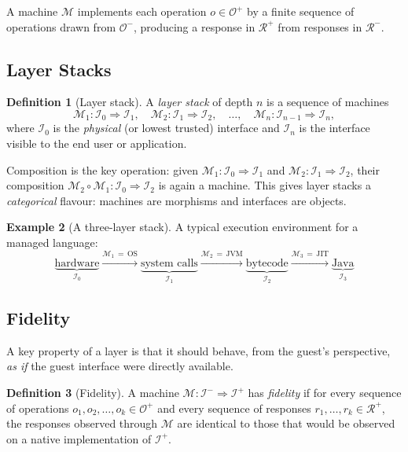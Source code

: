 \documentclass[11pt, a4paper]{article}
\theoremstyle{definition}
\newtheorem{definition}{Definition}[section]
\newtheorem{example}[definition]{Example}
\theoremstyle{plain}
\theoremstyle{remark}
\begin{document}
A machine $\mathcal{M}$ implements each operation $o \in \mathcal{O}^{+}$ by
a finite sequence of operations drawn from $\mathcal{O}^{-}$, producing a
response in $\mathcal{R}^{+}$ from responses in $\mathcal{R}^{-}$.

\subsection{Layer Stacks}

\begin{definition}[Layer stack]
  A \emph{layer stack} of depth $n$ is a sequence of machines
  \[
    \mathcal{M}_1 : \mathcal{I}_0 \Rightarrow \mathcal{I}_1, \quad
    \mathcal{M}_2 : \mathcal{I}_1 \Rightarrow \mathcal{I}_2, \quad
    \ldots, \quad
    \mathcal{M}_n : \mathcal{I}_{n-1} \Rightarrow \mathcal{I}_n,
  \]
  where $\mathcal{I}_0$ is the \emph{physical} (or lowest trusted) interface
  and $\mathcal{I}_n$ is the interface visible to the end user or application.
\end{definition}

Composition is the key operation: given
$\mathcal{M}_1 : \mathcal{I}_0 \Rightarrow \mathcal{I}_1$ and
$\mathcal{M}_2 : \mathcal{I}_1 \Rightarrow \mathcal{I}_2$, their composition
$\mathcal{M}_2 \circ \mathcal{M}_1 : \mathcal{I}_0 \Rightarrow \mathcal{I}_2$
is again a machine. This gives layer stacks a \emph{categorical} flavour:
machines are morphisms and interfaces are objects.

\begin{example}[A three-layer stack]
  A typical execution environment for a managed language:
  \[
    \underbrace{\text{hardware}}_{\mathcal{I}_0}
    \xrightarrow{\mathcal{M}_1\,=\,\text{OS}}
    \underbrace{\text{system calls}}_{\mathcal{I}_1}
    \xrightarrow{\mathcal{M}_2\,=\,\text{JVM}}
    \underbrace{\text{bytecode}}_{\mathcal{I}_2}
    \xrightarrow{\mathcal{M}_3\,=\,\text{JIT}}
    \underbrace{\text{Java}}_{\mathcal{I}_3}
  \]
\end{example}

\subsection{Fidelity}

A key property of a layer is that it should behave, from the guest's
perspective, \emph{as if} the guest interface were directly available.

\begin{definition}[Fidelity]
  A machine $\mathcal{M} : \mathcal{I}^{-} \Rightarrow \mathcal{I}^{+}$
  has \emph{fidelity} if for every sequence of operations
  $o_1, o_2, \ldots, o_k \in \mathcal{O}^{+}$ and every sequence of
  responses $r_1, \ldots, r_k \in \mathcal{R}^{+}$, the responses observed
  through $\mathcal{M}$ are identical to those that would be observed on a
  native implementation of $\mathcal{I}^{+}$.
\end{definition}
\end{document}

